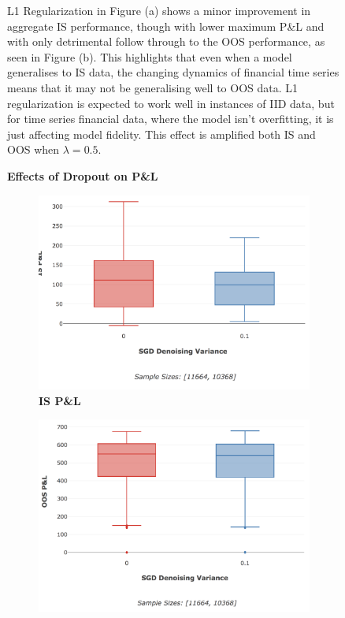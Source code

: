 \documentclass[a4paper,11pt,oneside]{article}
\theoremstyle{plain}
\theoremstyle{definition}
\begin{document}
\begin{figure}[H]
{			\newline L1 Regularization in Figure (a) shows a minor improvement in aggregate IS performance, though with lower maximum P\&L and with only detrimental follow through to the OOS performance, as seen in Figure (b). This highlights that even when a model generalises to IS data, the changing dynamics of financial time series means that it may not be generalising well to OOS data. L1 regularization is expected to work well in instances of IID data, but for time series financial data, where the model isn't overfitting, it is just affecting model fidelity. This effect is amplified both IS and OOS when $\lambda = 0.5$.}
		\label{figure-results-reg}
	\end{figure}
	
	\begin{figure}[H]
		\centering
		\textbf{Effects of Dropout on P\&L}
				\begin{subfigure}{.5\textwidth}
			\centering 
			\includegraphics[scale=0.3]{images/results/complexity/is_actual_pl_masking.png}
			\caption{\textbf{IS P\&L} }
			\label{figure-is_actual_pl_masking}
		\end{subfigure}%
		\begin{subfigure}{.5\textwidth}
			\centering 
			\includegraphics[scale=0.3]{images/results/complexity/oos_actual_pl_masking.png}

\end{subfigure}
\end{figure}
\end{document}
